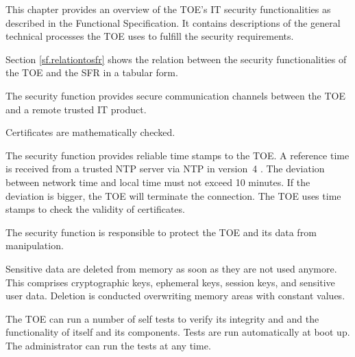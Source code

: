 
This chapter provides an overview of the TOE's IT security functionalities as
described in the Functional Specification. It contains descriptions of the
general technical processes the TOE uses to fulfill the security requirements.

Section \hyperref[sf.relationtosfr]{\ref*{sf.relationtosfr}} shows the relation
between the security functionalities of the TOE and the SFR in a tabular form.
 

The security function  provides secure communication channels
between the TOE and a remote trusted IT product.


Certificates are mathematically checked.



The security function  provides reliable time stamps
to the TOE. A reference time is received from a trusted NTP server via NTP in
version~4 \cite{rfc5905}. The deviation between network time and local time must
not exceed 10 minutes. If the deviation is bigger, the TOE will terminate the
connection. The TOE uses time stamps to check the validity of certificates.



The security function  is responsible to protect the
TOE and its data from manipulation.

Sensitive data are deleted from memory as soon as they are not used
anymore. This comprises cryptographic keys, ephemeral keys, session keys, and
sensitive user data. Deletion is conducted overwriting memory areas with
constant values.


The TOE can run a number of self tests to verify its integrity and and the
functionality of itself and its components. Tests are run automatically at boot
up. The administrator can run the tests at any time.


